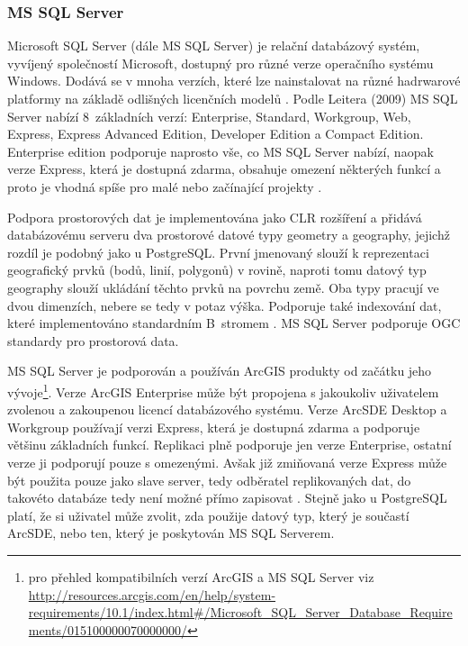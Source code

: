         \subsubsection{MS SQL Server}
        \label{MSSQL}
Microsoft SQL Server (dále MS SQL Server) je relační databázový systém, vyvíjený společností Microsoft, dostupný pro různé verze operačního systému Windows. Dodává se v mnoha verzích, které lze nainstalovat na různé hadrwarové platformy na základě odlišných licenčních modelů \citep{Whalen2008}. Podle Leitera (2009) MS SQL Server nabízí 8~základních verzí: Enterprise, Standard, Workgroup, Web, Express, Express Advanced Edition, Developer Edition a Compact Edition. Enterprise edition podporuje naprosto vše, co MS SQL Server nabízí, naopak verze Express, která je dostupná zdarma, obsahuje omezení některých funkcí a proto je vhodná spíše pro malé nebo začínající projekty \citep{Leiter2009}.

Podpora prostorových dat je implementována jako CLR rozšíření a přidává databázovému serveru dva prostorové datové typy geometry a geography, jejichž rozdíl je podobný jako u PostgreSQL. První jmenovaný slouží k reprezentaci geografický prvků (bodů, linií, polygonů) v rovině, naproti tomu datový typ geography slouží ukládání těchto prvků na povrchu země. Oba typy pracují ve dvou dimenzích, nebere se tedy v potaz výška. Podporuje také indexování dat, které implementováno standardním B~stromem \citep{Cincura2009}. MS SQL Server podporuje OGC standardy pro prostorová data.

MS SQL Server je podporován a používán ArcGIS produkty od začátku jeho vývoje\footnote{pro přehled kompatibilních verzí ArcGIS a MS SQL Server viz \url{http://resources.arcgis.com/en/help/system-requirements/10.1/index.html\#/Microsoft\_SQL\_Server\_Database\_Requirements/015100000070000000/}}. Verze ArcGIS Enterprise může být propojena s jakoukoliv uživatelem zvo\-le\-nou a zakoupenou licencí databázového systému. Verze ArcSDE Desktop a Workgroup používají verzi Express, která je dostupná zdarma a podporuje většinu základních funkcí. Replikaci plně podporuje jen verze Enterprise, ostatní verze ji podporují pouze s omezenými. Avšak již zmiňovaná verze Express může být použita pouze jako slave server, tedy odběratel replikovaných dat, do takovéto databáze tedy není možné přímo zapisovat \citep{Whalen2008}. Stejně jako u PostgreSQL platí, že si uživatel může zvolit, zda použije datový typ, který je součastí ArcSDE, nebo ten, který je poskytován MS SQL Serverem.


